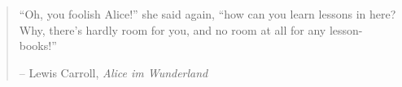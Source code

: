 
\newpage \vspace*{8cm}
\thispagestyle{empty}
\begin{quotation}
\begin{center}
  \large
  \enquote{Oh, you foolish Alice!} she said again, \enquote{how can you learn lessons in here? Why, there's hardly room for you, and no room at all for any lesson-books!}
\end{center}
\begin{flushright} -- Lewis Carroll, \textit{Alice im Wunderland}\end{flushright}
\end{quotation}
